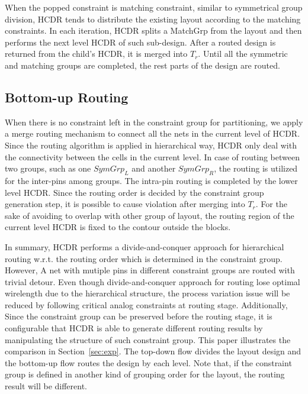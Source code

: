     When the popped  constraint is matching constraint, similar to symmetrical group division, HCDR tends to distribute the existing layout according to the matching constraints. In each iteration, HCDR splits a MatchGrp from the layout and then performs the next level HCDR of such sub-design. After a routed design is returned from the child's HCDR, it is merged into $T_r$. Until all the symmetric and matching groups are completed, the rest parts of the design are routed.

  \subsection{Bottom-up Routing}\label{sec:HCDR_BtmUp}

    When there is no constraint left in the constraint group for partitioning, we apply a merge routing mechanism to connect all the nets in the current level of HCDR. Since the routing algorithm is applied in hierarchical way, HCDR only deal with the connectivity between the cells in the current level. In case of routing between two groups, such as one $SymGrp_L$ and another $SymGrp_R$, the routing is utilized for the inter-pins among groups. The intra-pin routing is completed by the lower level HCDR. Since the routing order is decided by the constraint group generation step, it is possible to cause violation after merging into $T_r$. For the sake of avoiding to overlap with other group of layout, the routing region of the current level HCDR is fixed to the contour outside the blocks. 

  In summary, HCDR performs a divide-and-conquer approach for hierarchical routing w.r.t. the routing order which is determined in the constraint group. However, A net with mutiple pins in different constraint groups are routed with trivial detour. Even though divide-and-conquer approach for routing lose optimal wirelength due to the hierarchical structure, the process variation issue will be reduced by following critical analog constraints at routing stage. Additionally, Since the constraint group can be preserved before the routing stage, it is configurable that HCDR is able to generate different routing results by manipulating the structure of such constraint group. This paper illustrates the comparison in Section~\ref{sec:exp}. The top-down flow divides the layout design and the bottom-up flow routes the design by each level. Note that, if the constraint group is defined in another kind of grouping order for the layout, the routing result will be different.


    